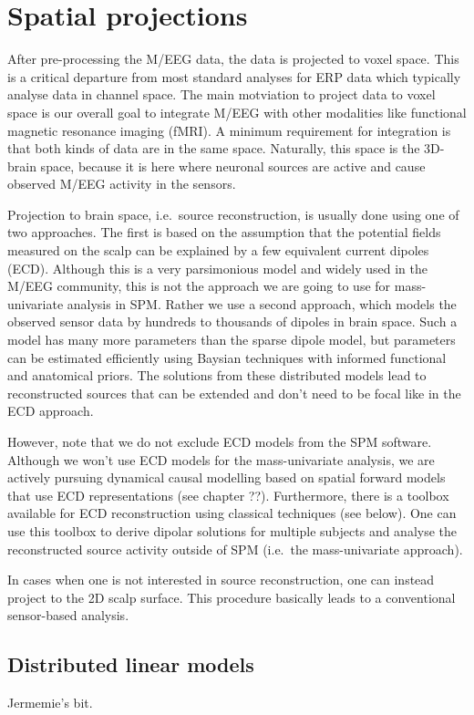 \chapter{Spatial projections}
\label{ch:eeg_source}
After pre-processing the M/EEG data, the data is projected to voxel
space. This is a critical departure from most standard analyses for
ERP data which typically analyse data in channel space. The main
motviation to project data to voxel space is our overall goal to integrate
M/EEG with other modalities like functional magnetic resonance imaging
(fMRI). A minimum requirement for integration is that both kinds of
data are in the same space. Naturally, this space is the 3D-brain
space, because it is here where neuronal sources are active and cause
observed M/EEG activity in the sensors. 

Projection to brain space, i.e.~source reconstruction, is usually done
using one of two approaches. The first is based on the assumption that
the potential fields measured on the scalp can be explained by a few
equivalent current dipoles (ECD). Although this is a very parsimonious
model and widely used in the M/EEG community, this is not the approach
we are going to use for mass-univariate analysis in SPM. Rather we use
a second approach, which models the observed sensor data by hundreds to
thousands of dipoles in brain space. Such a model has many more
parameters than the sparse dipole model, but parameters can be
estimated efficiently using Baysian techniques with informed
functional and anatomical priors. The solutions from these distributed
models lead to reconstructed sources that can be extended and don't
need to be focal like in the ECD approach.

However, note that we do not exclude ECD models from the SPM
software. Although we won't use ECD models for the mass-univariate
analysis, we are actively pursuing dynamical causal modelling based on
spatial forward models that use ECD representations (see chapter
??). Furthermore, there is a toolbox available for ECD reconstruction
using classical techniques (see below). One can use this toolbox to derive
dipolar solutions for multiple subjects and analyse the reconstructed
source activity outside of SPM (i.e.~the mass-univariate approach).

In cases when one is not interested in source reconstruction, one can
instead project to the 2D scalp surface. This procedure basically
leads to a conventional sensor-based analysis. 


\section{Distributed linear models}
Jermemie's bit.

